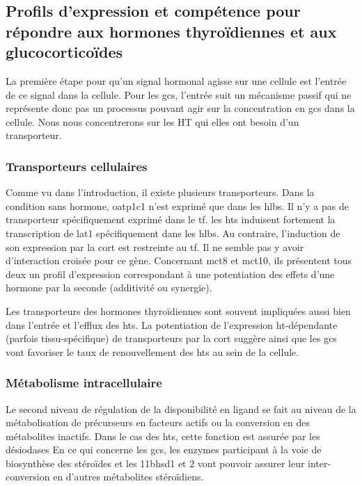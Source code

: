 \documentclass[../main.tex]{subfiles}
\begin{document}
\subsection{Profils d'expression et compétence pour répondre aux hormones thyroïdiennes et aux glucocorticoïdes}
La première étape pour qu'un signal hormonal agisse sur une cellule est l'entrée de ce signal dans la cellule.
Pour les \glspl{gc}, l'entrée suit un mécanisme passif qui ne représente donc pas un processus pouvant agir sur la concentration en \glspl{gc} dans la cellule.
Nous nous concentrerons sur les HT qui elles ont besoin d'un transporteur.

\subsubsection{Transporteurs cellulaires}
Comme vu dans l'introduction, il existe plusieurs transporteurs.
Dans la condition sans hormone, \gls{oatp}1c1 n'est exprimé que dans les \glspl{hlb}.
Il n'y a pas de transporteur spécifiquement exprimé dans le \gls{tf}.
les \glspl{ht} induisent fortement la transcription de \gls{lat}1 spécifiquement dans les \glspl{hlb}.
Au contraire, l'induction de son expression par la \gls{cort} est restreinte au \gls{tf}.
Il ne semble pas y avoir d'interaction croisée pour ce gène.
Concernant \gls{mct}8 et \gls{mct}10, ils présentent tous deux un profil d'expression correspondant à une potentiation des effets d'une hormone par la seconde (additivité ou synergie).
\par
Les transporteurs des hormones thyroïdiennes sont souvent impliquées aussi bien dans l'entrée et l'efflux des \glspl{ht}.
La potentiation de l'expression \gls{ht}-dépendante (parfois tissu-spécifique) de transporteurs par la \gls{cort} suggère ainsi que les \glspl{gc} vont favoriser le taux de renouvellement des \glspl{ht} au sein de la cellule.

\subsubsection{Métabolisme intracellulaire}
Le second niveau de régulation de la disponibilité en ligand se fait au niveau de la métabolisation de précurseurs en facteurs actifs ou la conversion en des métabolites inactifs.
Dans le cas des \glspl{ht}, cette fonction est assurée par les désiodases
En ce qui concerne les \glspl{gc}, les enzymes participant à la voie de biosynthèse des stéroïdes et les \gls{11bhsd1} et 2 vont pouvoir assurer leur inter-conversion en d'autres métabolites stéroïdiens.
\end{document}
